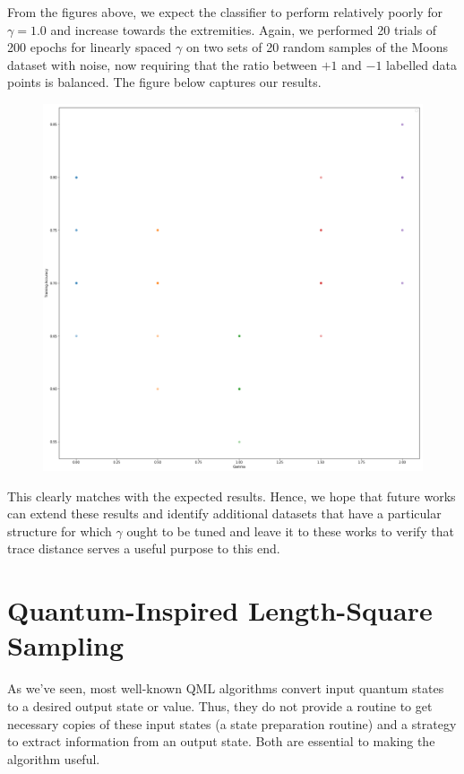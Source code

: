 \documentclass[main.tex]{subfiles}
\begin{document}
From the figures above, we expect the classifier to perform relatively poorly for $\gamma=1.0$ and increase towards the extremities. Again, we performed 20 trials of 200 epochs for linearly spaced $\gamma$ on two sets of 20 random samples of the Moons dataset with noise, now requiring that the ratio between $+1$ and $-1$ labelled data points is balanced. The figure below captures our results.

\begin{figure}[H]
\centering
\includegraphics[width=\textwidth]{images/moons_gammas_training}	
\end{figure}

This clearly matches with the expected results. Hence, we hope that future works can extend these results and identify additional datasets that have a particular structure for which $\gamma$ ought to be tuned and leave it to these works to verify that trace distance serves a useful purpose to this end.

\chapter{Quantum-Inspired Length-Square Sampling}
\label{sec:tang}

As we've seen, most well-known QML algorithms convert input quantum states to a desired output state or value. Thus, they do not provide a routine to get necessary copies of these input states (a state preparation routine) and a strategy to extract information from an output state. Both are essential to making the algorithm useful.
\end{document}
